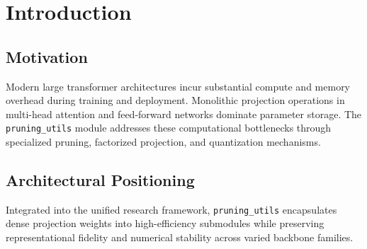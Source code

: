 \section{Introduction}

\subsection{Motivation}
Modern large transformer architectures incur substantial compute and memory overhead during training and deployment. Monolithic projection operations in multi-head attention and feed-forward networks dominate parameter storage. The \texttt{pruning_utils} module addresses these computational bottlenecks through specialized pruning, factorized projection, and quantization mechanisms.

\subsection{Architectural Positioning}
Integrated into the unified research framework, \texttt{pruning_utils} encapsulates dense projection weights into high-efficiency submodules while preserving representational fidelity and numerical stability across varied backbone families.

